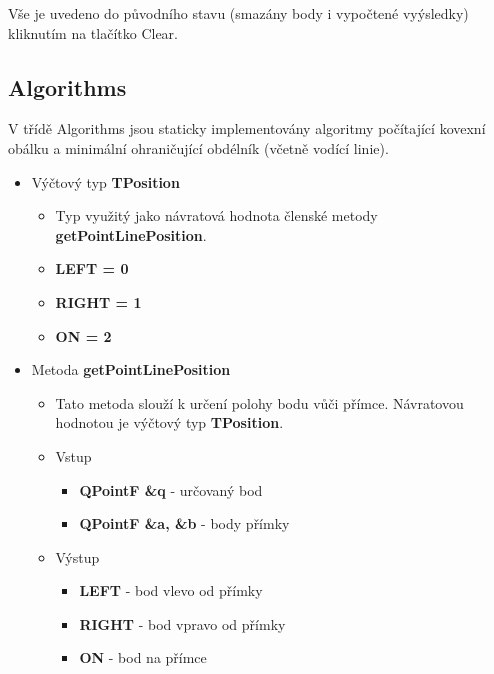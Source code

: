 \documentclass[a4paper, 12pt]{article}
\begin{document}
Vše je uvedeno do původního stavu (smazány body i vypočtené vyýsledky) kliknutím na tlačítko Clear.\\

\clearpage




\subsection{Algorithms}
V třídě Algorithms jsou staticky implementovány algoritmy počítající kovexní obálku a minimální ohraničující obdélník (včetně vodící linie).

\begin{itemize}

	\item Výčtový typ \textbf{TPosition}
		\begin{itemize}
			\item Typ využitý jako návratová hodnota členské metody \textbf{getPointLinePosition}.
			\item \textbf{LEFT = 0}
			\item \textbf{RIGHT = 1}
			\item \textbf{ON = 2}
		\end{itemize}

	\item Metoda \textbf{getPointLinePosition}
		\begin{itemize}
			\item Tato metoda slouží k určení polohy bodu vůči přímce. Návratovou hodnotou je výčtový typ \textbf{TPosition}.
			\item Vstup
				\begin{itemize}
					\item \textbf{QPointF \&q} - určovaný bod
					\item \textbf{QPointF \&a, \&b} - body přímky
				\end{itemize}
			\item Výstup
				\begin{itemize}
					\item \textbf{LEFT} - bod vlevo od přímky
					\item \textbf{RIGHT} - bod vpravo od přímky
					\item \textbf{ON} - bod na přímce
				\end{itemize}

		\end{itemize}


\end{itemize}
\end{document}
